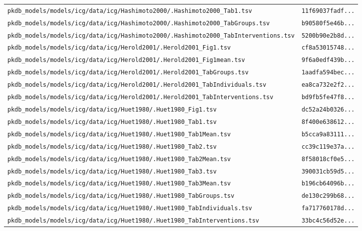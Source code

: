 \documentclass{article}
\begin{document}
\begin{longtable}{ll}
\texttt{pkdb\_models/models/icg/data/icg/Hashimoto2000/.Hashimoto2000\_Tab1.tsv} & \texttt{11f69037fadf...} \\
\texttt{pkdb\_models/models/icg/data/icg/Hashimoto2000/.Hashimoto2000\_TabGroups.tsv} & \texttt{b90580f5e46b...} \\
\texttt{pkdb\_models/models/icg/data/icg/Hashimoto2000/.Hashimoto2000\_TabInterventions.tsv} & \texttt{5200b90e2b8d...} \\
\texttt{pkdb\_models/models/icg/data/icg/Herold2001/.Herold2001\_Fig1.tsv} & \texttt{cf8a53015748...} \\
\texttt{pkdb\_models/models/icg/data/icg/Herold2001/.Herold2001\_Fig1mean.tsv} & \texttt{9f6a0edf439b...} \\
\texttt{pkdb\_models/models/icg/data/icg/Herold2001/.Herold2001\_TabGroups.tsv} & \texttt{1aadfa594bec...} \\
\texttt{pkdb\_models/models/icg/data/icg/Herold2001/.Herold2001\_TabIndividuals.tsv} & \texttt{ea8ca732e2f2...} \\
\texttt{pkdb\_models/models/icg/data/icg/Herold2001/.Herold2001\_TabInterventions.tsv} & \texttt{bd9fb5fe47f8...} \\
\texttt{pkdb\_models/models/icg/data/icg/Huet1980/.Huet1980\_Fig1.tsv} & \texttt{dc52a24b0326...} \\
\texttt{pkdb\_models/models/icg/data/icg/Huet1980/.Huet1980\_Tab1.tsv} & \texttt{8f400e638612...} \\
\texttt{pkdb\_models/models/icg/data/icg/Huet1980/.Huet1980\_Tab1Mean.tsv} & \texttt{b5cca9a83111...} \\
\texttt{pkdb\_models/models/icg/data/icg/Huet1980/.Huet1980\_Tab2.tsv} & \texttt{cc39c119e37a...} \\
\texttt{pkdb\_models/models/icg/data/icg/Huet1980/.Huet1980\_Tab2Mean.tsv} & \texttt{8f58018cf0e5...} \\
\texttt{pkdb\_models/models/icg/data/icg/Huet1980/.Huet1980\_Tab3.tsv} & \texttt{390031cb59d5...} \\
\texttt{pkdb\_models/models/icg/data/icg/Huet1980/.Huet1980\_Tab3Mean.tsv} & \texttt{b196cb64096b...} \\
\texttt{pkdb\_models/models/icg/data/icg/Huet1980/.Huet1980\_TabGroups.tsv} & \texttt{de130c299b68...} \\
\texttt{pkdb\_models/models/icg/data/icg/Huet1980/.Huet1980\_TabIndividuals.tsv} & \texttt{fa717760178d...} \\
\texttt{pkdb\_models/models/icg/data/icg/Huet1980/.Huet1980\_TabInterventions.tsv} & \texttt{33bc4c56d52e...} \\

\end{longtable}
\end{document}
